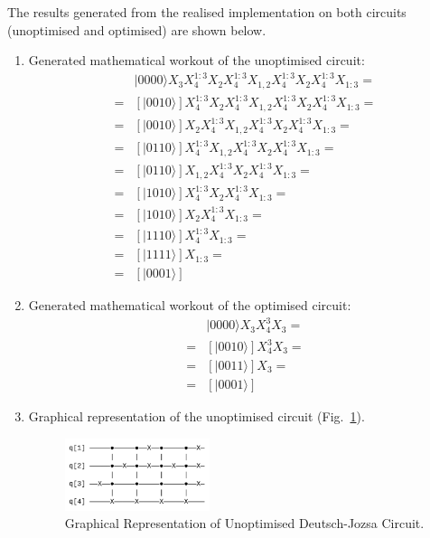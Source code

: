 The results generated from the realised implementation on both circuits (unoptimised and optimised) are shown below.

\begin{enumerate}
        \item Generated mathematical workout of the unoptimised circuit:
        \begin{align*}
         &|0000\rangle X_{3}X_{4}^{1:3}X_{2}X_{4}^{1:3}X_{1,2}X_{4}^{1:3}X_{2}X_{4}^{1:3}X_{1:3}=\\ 
            =& [ |0010\rangle ]X_{4}^{1:3}X_{2}X_{4}^{1:3}X_{1,2}X_{4}^{1:3}X_{2}X_{4}^{1:3}X_{1:3}=\\
            =& [ |0010\rangle ]X_{2}X_{4}^{1:3}X_{1,2}X_{4}^{1:3}X_{2}X_{4}^{1:3}X_{1:3}=\\
            =& [ |0110\rangle ]X_{4}^{1:3}X_{1,2}X_{4}^{1:3}X_{2}X_{4}^{1:3}X_{1:3}=\\
            =& [ |0110\rangle ]X_{1,2}X_{4}^{1:3}X_{2}X_{4}^{1:3}X_{1:3}=\\
            =& [ |1010\rangle ]X_{4}^{1:3}X_{2}X_{4}^{1:3}X_{1:3}=\\ 
            =& [ |1010\rangle ]X_{2}X_{4}^{1:3}X_{1:3}=\\ 
            =& [ |1110\rangle ]X_{4}^{1:3}X_{1:3}=\\ 
            =& [ |1111\rangle ]X_{1:3}=\\
            =& [ |0001\rangle ]
        \end{align*}

        \item Generated mathematical workout of the optimised circuit: 
        \begin{align*}
        &|0000\rangle X_{3}X_{4}^{3}X_{3}=\\
            =& [ |0010\rangle ]X_{4}^{3}X_{3}=\\
            =& [ |0011\rangle ]X_{3}=\\
            =& [ |0001\rangle ]
        \end{align*}
            
        \item Graphical representation of the unoptimised circuit (Fig.~\ref{dj1_qc}).
        \begin{figure}[!ht]
            \centerline{\includegraphics[width=0.4\textwidth]{algebraic circuits/dj1_qc.png}}
            \caption{Graphical Representation of Unoptimised Deutsch-Jozsa Circuit.}
            \label{dj1_qc}
        \end{figure}


\end{enumerate}
